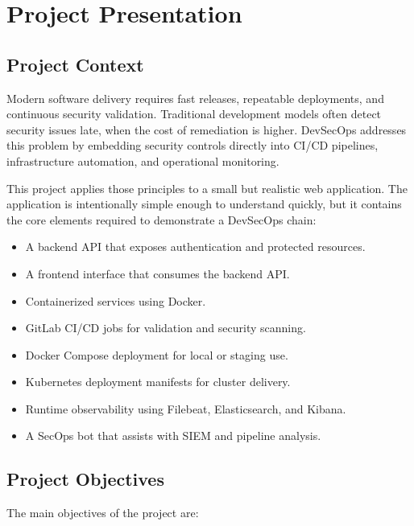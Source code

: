 \documentclass[12pt,a4paper]{report}
\begin{document}
\chapter{Project Presentation}

\section{Project Context}

Modern software delivery requires fast releases, repeatable deployments, and continuous security validation. Traditional development models often detect security issues late, when the cost of remediation is higher. DevSecOps addresses this problem by embedding security controls directly into CI/CD pipelines, infrastructure automation, and operational monitoring.

This project applies those principles to a small but realistic web application. The application is intentionally simple enough to understand quickly, but it contains the core elements required to demonstrate a DevSecOps chain:

\begin{itemize}[leftmargin=*]
    \item A backend API that exposes authentication and protected resources.
    \item A frontend interface that consumes the backend API.
    \item Containerized services using Docker.
    \item GitLab CI/CD jobs for validation and security scanning.
    \item Docker Compose deployment for local or staging use.
    \item Kubernetes deployment manifests for cluster delivery.
    \item Runtime observability using Filebeat, Elasticsearch, and Kibana.
    \item A SecOps bot that assists with SIEM and pipeline analysis.
\end{itemize}

\section{Project Objectives}

The main objectives of the project are:
\end{document}
